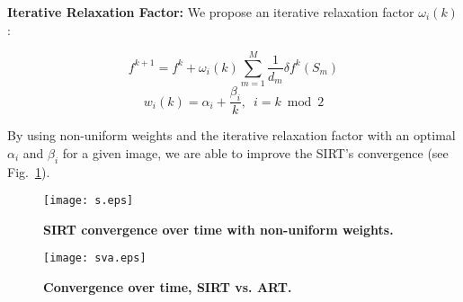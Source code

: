 \documentclass{sig-alternate}
\begin{document}
%
%

{\bf Iterative Relaxation Factor:} We propose an iterative relaxation factor $\omega_i(k)$:


\begin{equation}
f^{k+1} = f^k + \omega_i(k) \sum_{m=1}^M \frac{1}{d_m} \delta f^k(S_m)
\end{equation}
\begin{equation}
w_i(k) = \alpha_i + \frac{\beta_i}{k}, \,\,\, i = k \bmod 2
\end{equation}

By using non-uniform weights and the iterative relaxation factor with an optimal $\alpha_i$ and $\beta_i$ for a given image, we are able to improve the SIRT's convergence (see Fig.~\ref{nonuniform}).



\begin{figure}[th]
\centering
{\texttt{[image: s.eps]}} 
\caption{\bf SIRT convergence over time with non-uniform weights. } \label{nonuniform}
\end{figure}


\begin{figure}[th]
\centering
{\texttt{[image: sva.eps]}} 
\caption{\bf Convergence over time, SIRT vs. ART. } \label{sirtvsart}
\end{figure}
\end{document}
